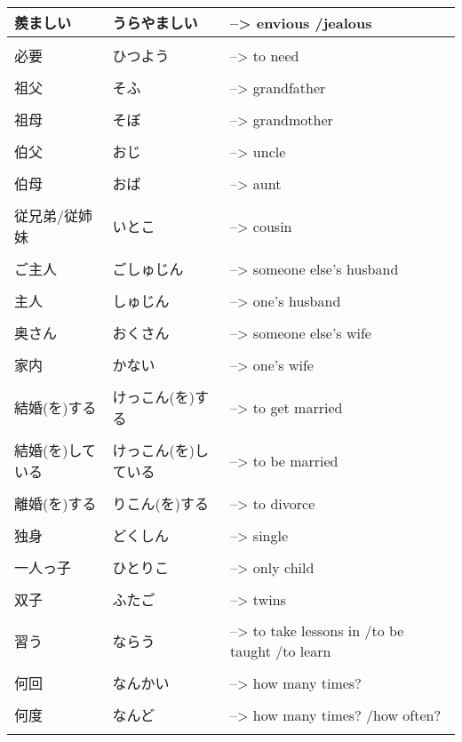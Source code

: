 \documentclass{article}
\begin{document}
\begin{tabular}{ p{3cm} | l l }
羨ましい    &うらやましい       &--> envious /jealous \\ \hline\\[-1em]
必要       &ひつよう           &--> to need \\ \hline\\[-1em]
祖父       &そふ               &--> grandfather \\ \hline\\[-1em]
祖母&そぼ&--> grandmother \\ \hline\\[-1em]
伯父&おじ&--> uncle \\ \hline\\[-1em]
伯母&おば&--> aunt \\ \hline\\[-1em]
従兄弟/従姉妹&いとこ&--> cousin \\ \hline\\[-1em]
ご主人&ごしゅじん&--> someone else's husband \\ \hline\\[-1em]
主人&しゅじん&--> one's husband \\ \hline\\[-1em]
奥さん&おくさん&--> someone else's wife \\ \hline\\[-1em]
家内&かない&--> one's wife \\ \hline\\[-1em]
結婚(を)する&けっこん(を)する&--> to get married \\ \hline\\[-1em]
結婚(を)している&けっこん(を)している&--> to be married \\ \hline\\[-1em]
離婚(を)する&りこん(を)する&--> to divorce \\ \hline\\[-1em]
独身&どくしん&--> single \\ \hline\\[-1em] 
一人っ子&ひとりこ&--> only child \\ \hline\\[-1em]
双子&ふたご&--> twins \\ \hline\\[-1em]
習う&ならう&--> to take lessons in /to be taught /to learn \\ \hline\\[-1em]
何回&なんかい&--> how many times? \\ \hline\\[-1em]
何度&なんど&--> how many times? /how often? \\ \hline\\[-1em]

\end{tabular}
\end{document}
